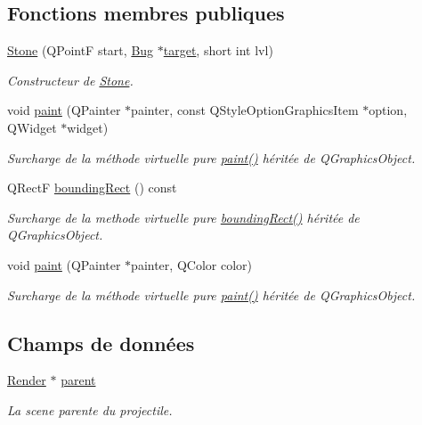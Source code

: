 \subsection*{Fonctions membres publiques}
\begin{DoxyCompactItemize}
\item 
\hyperlink{classStone_a7d5e2861bb294614f36d1d1f3ff4ae2a}{Stone} (QPointF start, \hyperlink{classBug}{Bug} $\ast$\hyperlink{classProjectile_ae5273bd2c6550b94f38310b69859b093}{target}, short int lvl)
\begin{DoxyCompactList}\small\item\em Constructeur de \hyperlink{classStone}{Stone}. \end{DoxyCompactList}\item 
void \hyperlink{classStone_a6bff8608f4ffbae0e227c017bd36884b}{paint} (QPainter $\ast$painter, const QStyleOptionGraphicsItem $\ast$option, QWidget $\ast$widget)
\begin{DoxyCompactList}\small\item\em Surcharge de la méthode virtuelle pure \hyperlink{classStone_a6bff8608f4ffbae0e227c017bd36884b}{paint()} héritée de QGraphicsObject. \end{DoxyCompactList}\item 
QRectF \hyperlink{classProjectile_a0e0b18909c9c154404384707c6515802}{boundingRect} () const 
\begin{DoxyCompactList}\small\item\em Surcharge de la methode virtuelle pure \hyperlink{classProjectile_a0e0b18909c9c154404384707c6515802}{boundingRect()} héritée de QGraphicsObject. \end{DoxyCompactList}\item 
void \hyperlink{classProjectile_aef0d6ffcea7620988cf5446d0c1133fa}{paint} (QPainter $\ast$painter, QColor color)
\begin{DoxyCompactList}\small\item\em Surcharge de la méthode virtuelle pure \hyperlink{classProjectile_aef0d6ffcea7620988cf5446d0c1133fa}{paint()} héritée de QGraphicsObject. \end{DoxyCompactList}\end{DoxyCompactItemize}
\subsection*{Champs de données}
\begin{DoxyCompactItemize}
\item 
\hyperlink{classRender}{Render} $\ast$ \hyperlink{classProjectile_a04924a3bccf3393aaa0f57d9384f617d}{parent}
\begin{DoxyCompactList}\small\item\em La scene parente du projectile. \end{DoxyCompactList}\end{DoxyCompactItemize}
